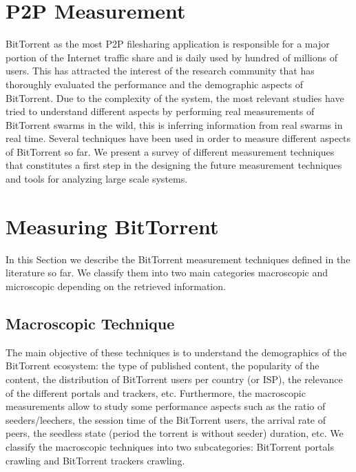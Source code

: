 \section{P2P Measurement}
BitTorrent as the most P2P filesharing application is responsible for a major portion of the Internet traffic share and is daily used by hundred of millions of users. 
This has attracted the interest of the research community that has thoroughly evaluated the performance and the demographic aspects of BitTorrent. 
Due to the complexity of the system, the most relevant studies have tried to understand different aspects by performing real measurements of BitTorrent swarms in the wild, this is inferring information from real swarms in real time.
Several techniques have been used in order to measure different aspects of BitTorrent so far. 
We present a survey of different measurement techniques that constitutes a first step in the designing the future measurement techniques and tools for analyzing large scale systems.

\section{Measuring BitTorrent}
In this Section we describe the BitTorrent measurement techniques defined in the literature so far. 
We classify them into two main categories macroscopic and microscopic depending on the retrieved information. 

\subsection{Macroscopic Technique}
The main objective of these techniques is to understand the demographics of the BitTorrent ecosystem: the type of published content, the popularity of the content, the distribution of BitTorrent users per country (or ISP), the relevance of the different portals and trackers, etc. 
Furthermore, the macroscopic measurements allow to study some performance aspects such as the ratio of seeders/leechers, the session time of the BitTorrent users, the arrival rate of peers, the seedless state (period the torrent is without seeder) duration, etc.
We classify the macroscopic techniques into two subcategories: BitTorrent portals crawling and BitTorrent trackers crawling.


